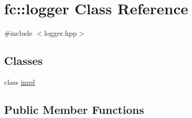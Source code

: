 \hypertarget{classfc_1_1logger}{}\section{fc\+:\+:logger Class Reference}
\label{classfc_1_1logger}


{\ttfamily \#include $<$logger.\+hpp$>$}

\subsection*{Classes}
\begin{DoxyCompactItemize}
\item 
class \mbox{\hyperlink{classfc_1_1logger_1_1impl}{impl}}
\end{DoxyCompactItemize}
\subsection*{Public Member Functions}
